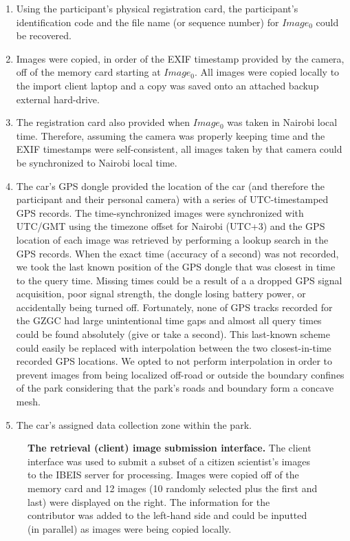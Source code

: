 \begin{enumerate}
	\item Using the participant's physical registration card, the participant's identification code and the file name (or sequence number) for $Image_0$ could be recovered.
	\item Images were copied, in order of the EXIF timestamp provided by the camera, off of the memory card starting at $Image_0$.  All images were copied locally to the import client laptop and a copy was saved onto an attached backup external hard-drive.
	\item The registration card also provided when $Image_0$ was taken in Nairobi local time.  Therefore, assuming the camera was properly keeping time and the EXIF timestamps were self-consistent, all images taken by that camera could be synchronized to Nairobi local time.
	\item The car's GPS dongle provided the location of the car (and therefore the participant and their personal camera) with a series of UTC-timestamped GPS records.  The time-synchronized images were synchronized with UTC/GMT using the timezone offset for Nairobi (UTC+3) and the GPS location of each image was retrieved by performing a lookup search in the GPS records.  When the exact time (accuracy of a second) was not recorded, we took the last known position of the GPS dongle that was closest in time to the query time.  Missing times could be a result of a a dropped GPS signal acquisition, poor signal strength, the dongle losing battery power, or accidentally being turned off.  Fortunately, none of GPS tracks recorded for the GZGC had large unintentional time gaps and almost all query times could be found absolutely (give or take a second).  This last-known scheme could easily be replaced with interpolation between the two closest-in-time recorded GPS locations.  We opted to not perform interpolation in order to prevent images from being localized off-road or outside the boundary confines of the park considering that the park's roads and boundary form a concave mesh.
	\item The car's assigned data collection zone within the park.
\end{enumerate}

\begin{figure}[t]%
	\centering
    	\caption[The Retrieval (Client) Image Submission Interface]{\textbf{The retrieval (client) image submission interface.}  The client interface was used to submit a subset of a citizen scientist's images to the IBEIS server for processing.  Images were copied off of the memory card and 12 images (10 randomly selected plus the first and last) were displayed on the right.  The information for the contributor was added to the left-hand side and could be inputted (in parallel) as images were being copied locally.}
    	\label{fig:client-images}
\end{figure}

